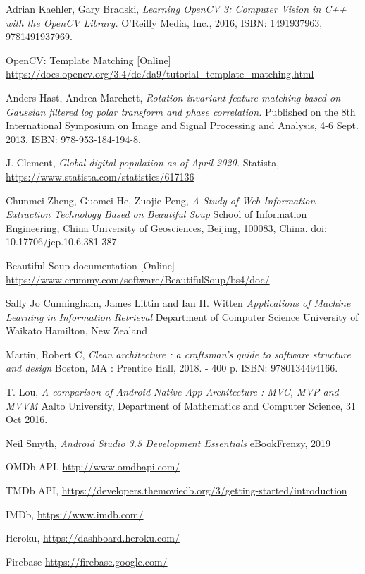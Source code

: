 \documentclass[12pt,a4paper,twoside]{report}
\begin{document}
\begin{thebibliography}{9}
Adrian Kaehler, Gary Bradski,
\textit{Learning OpenCV 3: Computer Vision in C++ with the OpenCV Library.}
O'Reilly Media, Inc., 2016, ISBN: 1491937963, 9781491937969.

OpenCV: Template Matching [Online]\\
\url{https://docs.opencv.org/3.4/de/da9/tutorial\_template\_matching.html}

Anders Hast, Andrea Marchett,
\textit{Rotation invariant feature matching-based on Gaussian filtered log polar transform and phase correlation.}
Published on the 8th International Symposium on Image and Signal Processing and Analysis, 4-6 Sept. 2013, ISBN: 978-953-184-194-8.

J. Clement,
\textit{Global digital population as of April 2020.} Statista, 
\url{https://www.statista.com/statistics/617136}

Chunmei Zheng, Guomei He, Zuojie Peng,
\textit{A Study of Web Information Extraction Technology Based on Beautiful Soup}
School of Information Engineering, China University of Geosciences, Beijing, 100083, China. 
doi: 10.17706/jcp.10.6.381-387

Beautiful Soup documentation [Online]\\
\url{https://www.crummy.com/software/BeautifulSoup/bs4/doc/}

Sally Jo Cunningham, James Littin and Ian H. Witten
\textit{Applications of Machine Learning in Information Retrieval}
Department of Computer Science
University of Waikato
Hamilton, New Zealand

Martin, Robert C,
\textit{Clean architecture : a craftsman's guide to software structure and design}
Boston, MA : Prentice Hall, 2018. - 400 p. ISBN: 9780134494166.

T. Lou,
\textit{A comparison of Android Native App Architecture
: MVC, MVP and MVVM}
Aalto University, Department of Mathematics and Computer Science, 31 Oct 2016.

Neil Smyth,
\textit{Android Studio 3.5 Development Essentials}
eBookFrenzy, 2019

OMDb API,
\url{http://www.omdbapi.com/}

TMDb API,
\url{https://developers.themoviedb.org/3/getting-started/introduction}

IMDb,
\url{https://www.imdb.com/}

Heroku,
\url{https://dashboard.heroku.com/}

Firebase
\url{https://firebase.google.com/}

\end{thebibliography}
\end{document}
